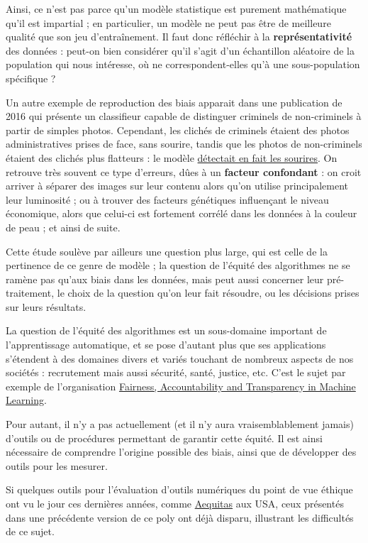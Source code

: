 Ainsi, ce n'est pas parce qu'un modèle statistique est purement mathématique
qu'il est impartial ; en particulier, un modèle ne peut pas être de meilleure
qualité que son jeu d'entraînement. Il faut donc réfléchir à la
\textbf{représentativité} des données : peut-on bien considérer qu'il s'agit
d'un échantillon aléatoire de la population qui nous intéresse, où ne
correspondent-elles qu'à une sous-population spécifique ?

Un autre exemple de reproduction des biais apparait dans une publication de
2016 qui présente un classifieur capable de distinguer criminels de
non-criminels à partir de simples photos. Cependant, les clichés de criminels
étaient des photos administratives prises de face, sans sourire, tandis que les
photos de non-criminels étaient des clichés plus flatteurs : le modèle
 \href{https://callingbullshit.org/case\_studies/case\_study\_criminal\_machine\_learning.html}{détectait
  en fait les sourires}. On retrouve très souvent ce type d'erreurs, dûes à un
\textbf{facteur confondant} : on croit arriver à séparer des images sur leur
contenu alors qu'on utilise principalement leur luminosité ; ou à trouver des
facteurs génétiques influençant le niveau économique, alors que celui-ci est
fortement corrélé dans les données à la couleur de peau ; et ainsi de suite.

Cette étude soulève par ailleurs une question plus large, qui est celle de la
pertinence de ce genre de modèle ; la question de l'équité des algorithmes ne
se ramène pas qu'aux biais dans les données, mais peut aussi concerner leur
pré-traitement, le choix de la question qu'on leur fait résoudre, ou les
décisions prises sur leurs résultats.

La question de l'équité des algorithmes est un sous-domaine important de
l'apprentissage automatique, et se pose d'autant plus que ses applications
s'étendent à des domaines divers et variés touchant de nombreux aspects de nos
sociétés : recrutement mais aussi sécurité, santé, justice, etc. 
C'est le sujet par exemple de l'organisation
\href{https://facctconference.org}{Fairness, Accountability and Transparency in
  Machine Learning}.

Pour autant, il n'y a pas actuellement (et il n'y aura vraisemblablement
jamais) d'outils ou de procédures permettant de garantir cette équité. Il est
ainsi nécessaire de comprendre l'origine possible des biais, ainsi que de
développer des outils pour les mesurer.

Si quelques outils pour l'évaluation d'outils numériques du point de vue
éthique ont vu le jour ces dernières années, comme
\href{http://aequitas.dssg.io/}{Aequitas} aux USA, ceux présentés dans une précédente version de ce poly ont déjà disparu, illustrant les difficultés de ce sujet.

